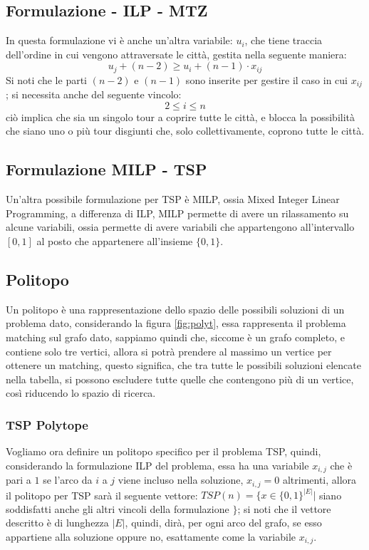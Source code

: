 \documentclass[12pt,a4paper]{article}
\begin{document}
\subsection{Formulazione - ILP - MTZ}
In questa formulazione vi è anche un'altra variabile: $u_i$, che tiene traccia dell'ordine in cui vengono attraversate le città, gestita nella seguente maniera: $$u_j + (n - 2) \geq u_i + (n - 1) \cdot x_{ij}$$
Si noti che le parti $(n - 2)$ e $(n - 1)$ sono inserite per gestire il caso in cui $x_{ij}$; si necessita anche del seguente vincolo: $$2 \leq i \leq n$$ ciò implica che sia un singolo tour a coprire tutte le città, e blocca la possibilità che siano uno o più tour disgiunti che, solo collettivamente, coprono tutte le città.

\subsection{Formulazione MILP - TSP}
Un'altra possibile formulazione per TSP è MILP, ossia Mixed Integer Linear Programming, a differenza di ILP, MILP permette di avere un rilassamento su alcune variabili, ossia permette di avere variabili che appartengono all'intervallo $[0, 1]$ al posto che appartenere all'insieme $ \lbrace 0, 1 \rbrace $.

\subsection{Politopo}
Un politopo è una rappresentazione dello spazio delle possibili soluzioni di un problema dato, considerando la figura \ref{fig:polyt}, essa rappresenta il problema matching sul grafo dato, sappiamo quindi che, siccome è un grafo completo, e contiene solo tre vertici, allora si potrà prendere al massimo un vertice per ottenere un matching, questo significa, che tra tutte le possibili soluzioni elencate nella tabella, si possono escludere tutte quelle che contengono più di un vertice, così riducendo lo spazio di ricerca.

\subsubsection{TSP Polytope}
Vogliamo ora definire un politopo specifico per il problema TSP, quindi, considerando la formulazione ILP del problema, essa ha una variabile $x_{i, j}$ che è pari a $1$ se l'arco da $i$ a $j$ viene incluso nella soluzione, $x_{i, j} = 0$ altrimenti, allora il politopo per TSP sarà il seguente vettore: $TSP(n) = \lbrace x \in \lbrace0, 1\rbrace^{\vert E \vert}  \vert $ siano soddisfatti anche gli altri vincoli della formulazione $\rbrace $; si noti che il vettore descritto è di lunghezza $\vert E \vert$, quindi, dirà, per ogni arco del grafo, se esso appartiene alla soluzione oppure no, esattamente come la variabile $x_{i, j}$.
\end{document}
